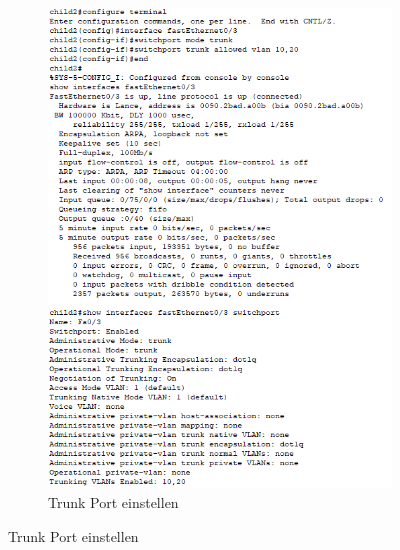 \begin{figure}[!htb]\ContinuedFloat
    \begin{subfigure}{\textwidth}
        \includegraphics[width=\textwidth,height=.95\textheight]{./img/Access2/trunk.png}
        \caption{Trunk Port einstellen}
    \end{subfigure}
\end{figure}


